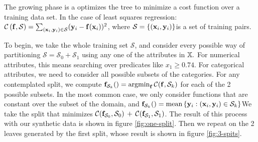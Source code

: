 \documentclass[10pt,openany]{article}
\numberwithin{definition}{section}
\numberwithin{example}{section}
\numberwithin{equation}{section}
\numberwithin{figure}{section}
\begin{document}
The growing phase is a optimizes the tree to minimize a cost function
over a training data set. In the case of least squares regression:
$\mathcal{C}\left({\mathbf f},\mathcal{S}\right)=\sum_{({\mathbf x}_{i},{\mathbf y}_{i})\in\mathcal{S}}({\mathbf y}_{i}-{\mathbf f}({\mathbf x}_{i}))^{2}$,
where $\mathcal{S}=\left\{ ({\mathbf x}_{i},{\mathbf y}_{i})\right\} $is a set of training
pairs.

To begin, we take the whole training set $\mathcal{S}$, and consider
every possible way of partitioning $\mathcal{S}=\mathcal{S}_{0}+\mathcal{S}_{1}$
using any one of the attributes in $\mathbb{X}.$ For numerical attributes,
this means searching over predicates like $x_{1}\geq0.74$. For categorical
attributes, we need to consider all possible subsets of the categories.
For any contemplated split, we compute ${\mathbf f}_{\mathcal{S}_{k}}()=\operatorname*{argmin}_{{\mathbf f}}\mathcal{C}({\mathbf f},\mathcal{S}_{k})$
for each of the 2 possible subsets. In the most common case, we only
consider functions that are constant over the subset of the domain,
and ${\mathbf f}_{\mathcal{S}_{k}}()=\text{mean}\left\{ {\mathbf y}_{i}:({\mathbf x}_{i},{\mathbf y}_{i})\in\mathcal{S}_{k}\right\} $We
take the split that minimizes $\mathcal{C}({\mathbf f}_{\mathcal{S}_{0}},\mathcal{S}_{0})\,+\,\mathcal{C}({\mathbf f}_{\mathcal{S}_{1}},\mathcal{S}_{1})$.
The result of this process with our synthetic data is shown in figure
\ref{fig:one-split}. Then we repeat on the 2 leaves generated by
the first split, whose result is shown in figure \ref{fig:3-spits}.
\end{document}
